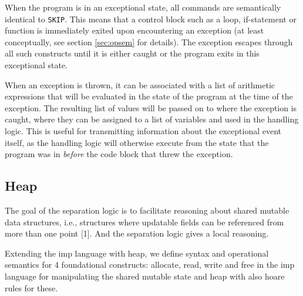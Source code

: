 When the program is in an exceptional state, all commands are semantically identical to \verb|SKIP|. This means that a control block such as a loop, if-statement or function is immediately exited upon encountering an exception (at least conceptually, see section \ref{sec:opsem}  for details). The exception escapes through all such constructs until it is either caught or the program exits in this exceptional state.

When an exception is thrown, it can be associated with a list of arithmetic expressions that will be evaluated in the state of the program at the time of the exception. The resulting list of values will be passed on to where the exception is caught, where they can be assigned to a list of variables and used in the handling logic. This is useful for transmitting information about the exceptional event itself, as the handling logic will otherwise execute from the state that the program was in \emph{before} the code block that threw the exception.

\subsection{Heap}
The goal of the separation logic is to facilitate reasoning about shared mutable data structures, i.e., structures where updatable fields can be referenced from more than one point [1].  And the separation logic gives a local reasoning.

Extending the imp language with heap, we define syntax and operational semantics  for 4 foundational constructs: allocate, read, write and free in the imp language for manipulating the shared mutable state and heap with also hoare rules for these.
